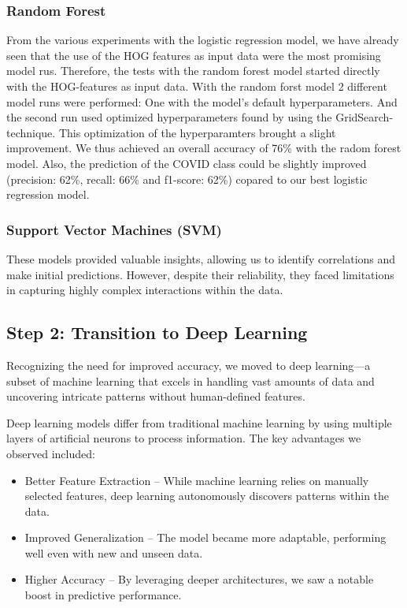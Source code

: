 \documentclass{article}
\begin{document}
\subsubsection{Random Forest}
From the various experiments with the logistic regression model, we have already seen that the use of the HOG features as input data were the most promising model rus. Therefore, the tests with the random forest model started directly with the HOG-features as input data. With the random forst model 2 different model runs were performed: One with the model's default hyperparameters. And the second run used optimized hyperparameters found by using the GridSearch-technique.  This optimization of the hyperparamters brought a slight improvement. We thus achieved an overall accuracy of 76\% with the radom forest model. Also, the prediction of the COVID class could be slightly improved (precision: 62\%, recall: 66\% and f1-score: 62\%) copared to our best logistic regression model.

\subsubsection{Support Vector Machines (SVM)}



These models provided valuable insights, allowing us to identify correlations and make initial predictions. However, despite their reliability, they faced limitations in capturing highly complex interactions within the data.

\subsection{Step 2: Transition to Deep Learning}
Recognizing the need for improved accuracy, we moved to deep learning—a subset of machine learning that excels in handling vast amounts of data and uncovering intricate patterns without human-defined features.

Deep learning models differ from traditional machine learning by using multiple layers of artificial neurons to process information. The key advantages we observed included:

\begin{itemize}
    \item Better Feature Extraction – While machine learning relies on manually selected features, deep learning autonomously discovers patterns within the data.
    \item Improved Generalization – The model became more adaptable, performing well even with new and unseen data. 
    \item Higher Accuracy – By leveraging deeper architectures, we saw a notable boost in predictive performance.
\end{itemize}
\end{document}
